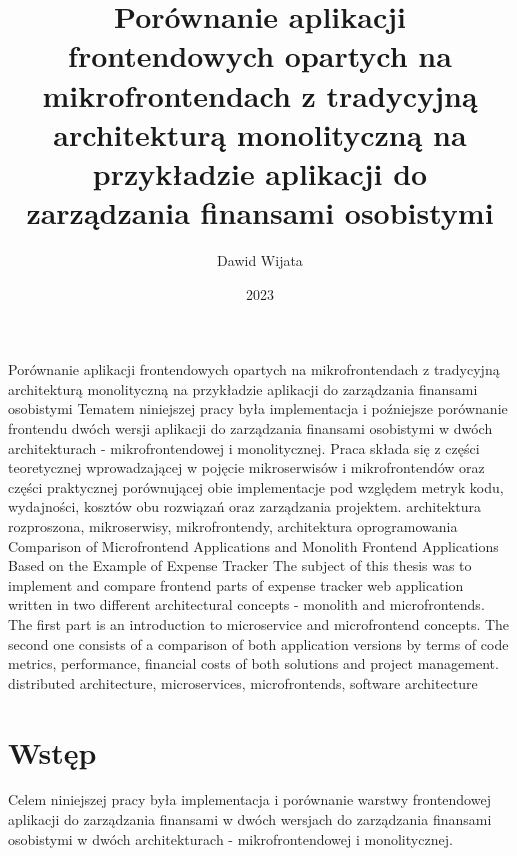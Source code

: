 \documentclass{SGGW-thesis}
\title{Porównanie aplikacji frontendowych opartych na mikrofrontendach z tradycyjną architekturą monolityczną na przykładzie aplikacji do zarządzania finansami osobistymi}
\author{Dawid Wijata}
\date{2023}
\begin{document}

\makeatother

\maketitle
\statementpage
\abstractpage
{Porównanie aplikacji frontendowych opartych na mikrofrontendach z tradycyjną architekturą monolityczną na przykładzie aplikacji do zarządzania finansami osobistymi}
{Tematem niniejszej pracy była implementacja i poźniejsze porównanie frontendu dwóch wersji aplikacji do zarządzania finansami osobistymi w dwóch architekturach - mikrofrontendowej i monolitycznej. Praca składa się z części teoretycznej wprowadzającej w pojęcie mikroserwisów i mikrofrontendów oraz części praktycznej porównującej obie implementacje pod względem metryk kodu, wydajności, kosztów obu rozwiązań oraz zarządzania projektem.}
{architektura rozproszona, mikroserwisy, mikrofrontendy, architektura oprogramowania}
{Comparison of Microfrontend Applications and Monolith Frontend Applications Based on the Example of Expense Tracker}
{The subject of this thesis was to implement and compare frontend parts of expense tracker web application written in two different architectural concepts - monolith and microfrontends. The first part is an introduction to microservice and microfrontend concepts. The second one consists of a comparison of both application versions by terms of code metrics, performance, financial costs of both solutions and project management.}
{distributed architecture, microservices, microfrontends, software architecture}

{
	\doublespacing
	\tableofcontents
}

\startchapterfromoddpage %

\chapter{Wstęp}
Celem niniejszej pracy była implementacja i porównanie warstwy frontendowej aplikacji do zarządzania finansami w dwóch wersjach do zarządzania finansami osobistymi w dwóch architekturach - mikrofrontendowej i monolitycznej.
\end{document}
